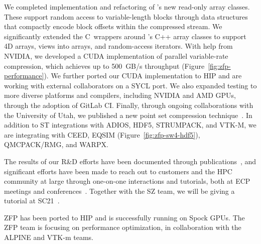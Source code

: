 We completed implementation and refactoring of \zfp's new read-only array classes.
These support random access to variable-length blocks through data structures that compactly encode block offsets within the compressed stream.
We significantly extended the C~wrappers around \zfp's C++ array classes to support 4D arrays, views into arrays, and random-access iterators.
With help from NVIDIA, we developed a CUDA implementation of parallel variable-rate compression, which achieves up to 500~GB/s throughput (Figure~\ref{fig:zfp-performance}).
We further ported our CUDA implementation to HIP and are working with external collaborators on a SYCL port.
We also expanded {\zfp} testing to more diverse platforms and compilers, including NVIDIA and AMD GPUs, through the adoption of GitLab CI.
Finally, through ongoing collaborations with the University of Utah, we published a new point set compression technique~\cite{zfp-ldav2021}.
In addition to ST integrations with \uppercase{adios}, \uppercase{hdf5}, \uppercase{strumpack}, and \uppercase{vtk-m}, we are integrating {\zfp} with \uppercase{ceed}, \uppercase{eqsim} (Figure~\ref{fig:zfp-sw4-hdf5}), \uppercase{qmcpack}/\uppercase{rmg}, and \uppercase{warpx}.

The results of our R\&D efforts have been documented through publications~\cite{zfp-isc2017,zfp-jsm2017,zfp-sisc2019,zfp-drbsd2019,zfp-pdp2020,zfp-vis2020,zfp-ldav2021}, and significant efforts have been made to reach out to customers and the HPC community at large through one-on-one interactions and tutorials, both at ECP meetings and conferences~\cite{zfp-isc2017-tut,zfp-sc2017-tut,zfp-ep2018-tut,zfp-sc2018-tut,zfp-isc2019-tut,zfp-sc2019-tut,zfp-sc2020-tut,zfp-sc2020-pan}.  Together with the \uppercase{sz} team, we will be giving a tutorial at SC21~\cite{zfp-sc2021-tut}.

ZFP has been ported to HIP and is successfully running on Spock GPUs.  The ZFP team is focusing on performance optimization, in collaboration with the ALPINE and VTK-m teams.  


